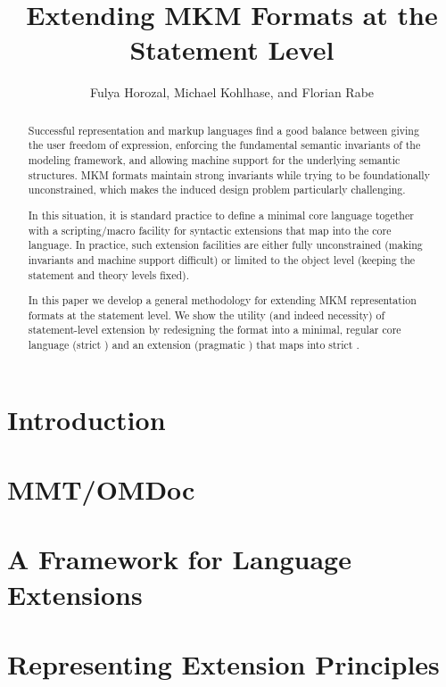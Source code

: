 \documentclass{llncs}
\title{Extending MKM Formats at the Statement Level}
\author{Fulya Horozal, Michael Kohlhase, and Florian Rabe}
\institute{
\begin{tabular}[t]{c}
  Computer Science, Jacobs University Bremen, Germany
  \url{http://kwarc.info}
\end{tabular}
}
\begin{document}
\maketitle
\begin{abstract}
  Successful representation and markup languages find a good balance between giving the
  user freedom of expression, enforcing the fundamental semantic invariants of the
  modeling framework, and allowing machine support for the underlying semantic
  structures. MKM formats maintain strong invariants while trying to be foundationally
  unconstrained, which makes the induced design problem particularly challenging.

  In this situation, it is standard practice to define a minimal core language together
  with a scripting/macro facility for syntactic extensions that map into the core
  language. In practice, such extension facilities are either fully unconstrained (making
  invariants and machine support difficult) or limited to the object level (keeping the
  statement and theory levels fixed). 

  In this paper we develop a general methodology for extending MKM representation formats
  at the statement level. We show the utility (and indeed necessity) of statement-level
  extension by redesigning the \omdoc format into a minimal, regular core language (strict
  \omdoc) and an extension (pragmatic \omdoc) that maps into strict \omdoc.
\end{abstract}

\section{Introduction}\label{sec:intro}
 
  
  
\section{MMT/OMDoc}\label{sec:mmt}
 
  
\section{A Framework for Language Extensions}\label{sec:pattern}  
 
  
\section{Representing Extension Principles}\label{sec:meta}
 
  
\end{document}

